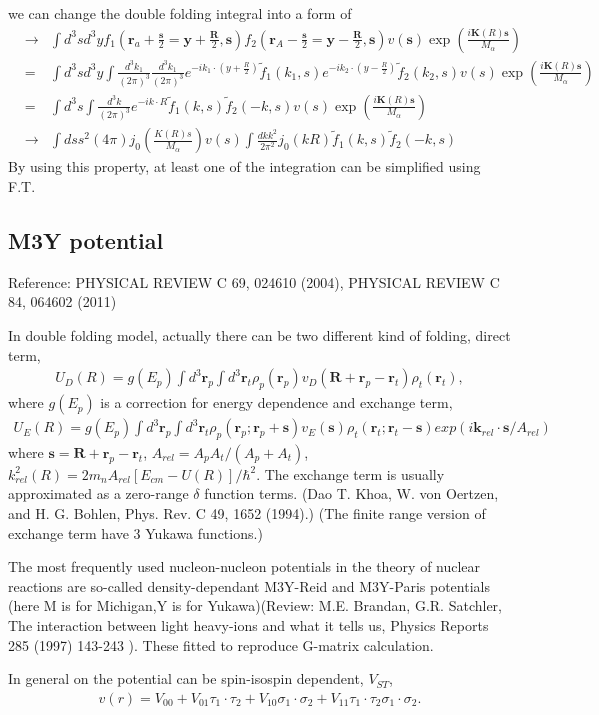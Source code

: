 \documentclass[11pt]{book}
\def\bm{\boldsymbol}
\def\vk{{\bm k}}
\def\vr{{\bm r}}
\def\vR{{\bm R}}
\newcommand{\bea}{\begin{eqnarray}}
\newcommand{\eea}{\end{eqnarray}}
\newcommand{\no}{\nonumber \\}
\begin{document}
we can change the double folding integral into a form of 
\bea 
&\to& \int d^3 s d^3 y f_1(\vr_a+\frac{\bm s}{2}={\bm y}+\frac{\bm R}{2},{\bm s})
    f_2(\vr_A-\frac{\bm s}{2}={\bm y}-\frac{\bm R}{2} ,{\bm s}) 
    v({\bm s})\exp(\frac{i {\bm K(R)} {\bm s}}{M_\alpha}) \no 
&=& \int d^3 s d^3 y\int \frac{d^3 k_1}{(2\pi)^3} \frac{d^3 k_1}{(2\pi)^3}
    e^{-ik_1\cdot(y+\frac{R}{2})}\tilde{f}_1(k_1,s) 
    e^{-ik_2\cdot(y-\frac{R}{2})}\tilde{f}_2(k_2,s) v(s) \exp(\frac{i {\bm K(R)} {\bm s}}{M_\alpha})\no 
&=& \int d^3 s \int \frac{d^3 k}{(2\pi)^3} e^{-ik\cdot R}\tilde{f}_1(k ,s) 
\tilde{f}_2(-k,s) v(s) \exp(\frac{i {\bm K(R)} {\bm s}}{M_\alpha})    \no 
&\to& \int ds s^2 (4\pi) j_0( \frac{K(R)s}{M_\alpha})v(s) 
    \int \frac{dk k^2}{2\pi^2} j_0(k R)\tilde{f}_1(k ,s)\tilde{f}_2(-k,s)
\eea 
By using this property, at least one of the integration can be simplified using F.T. 


\subsection{M3Y potential}
Reference: PHYSICAL REVIEW C 69, 024610 (2004), PHYSICAL REVIEW C 84, 064602 (2011)

In double folding model, actually there can be two different kind of folding, direct term, 
\bea 
U_D(R)= g(E_p)\int d^3 \vr_p \int d^3 \vr_t \rho_{p}(\vr_p) v_D(\vR+\vr_p-\vr_t) \rho_{t}(\vr_t),
\eea
where $g(E_p)$ is a correction for energy dependence 
and exchange term,
\bea 
U_E(R) = g(E_p)\int d^3\vr_p \int d^3\vr_t  \rho_p(\vr_p;\vr_p+{\bm s}) v_E({\bm s})\rho_t(\vr_t;\vr_t-{\bm s})
         exp( i\vk_{rel}\cdot{\bm s} /A_{rel}) 
\eea 
where ${\bm s}=\vR+\vr_p-\vr_t$, $A_{rel}=A_p A_t/(A_p+A_t)$, $k_{rel}^2(R)=2 m_n A_{rel}[E_{cm}-U(R)]/\hbar^2$.
The exchange term is usually approximated as a zero-range $\delta$ function terms. (Dao T. Khoa, W. von Oertzen, and H. G. Bohlen, Phys. Rev. C
49, 1652 (1994).) (The finite range version of exchange term have 3 Yukawa functions.)

The most frequently used nucleon-nucleon potentials in the theory of
nuclear reactions are so-called density-dependant M3Y-Reid and M3Y-Paris
potentials (here M is for Michigan,Y is for Yukawa)(Review: M.E. Brandan, G.R. Satchler, The interaction between light heavy-ions
and what it tells us, Physics Reports 285 (1997) 143-243 ). 
These fitted to reproduce G-matrix calculation. 

In general on the potential can be spin-isospin dependent, $V_{ST}$,
\bea 
v(r) =V_{00}+V_{01}\tau_1\cdot\tau_2 +V_{10}\sigma_1\cdot\sigma_2+V_{11}\tau_1\cdot\tau_2\sigma_1\cdot\sigma_2. 
\eea 
\end{document}
